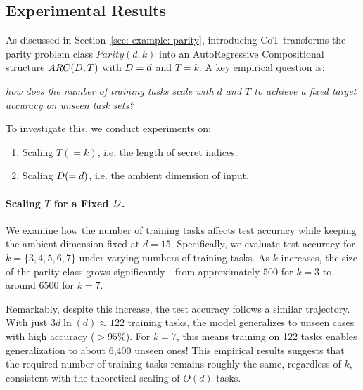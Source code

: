 \vspace{-2mm}
\subsection{Experimental Results}
 As discussed in Section~\ref{sec: example: parity}, introducing CoT transforms the parity problem class \( Parity(d,k) \) into an AutoRegressive Compositional structure \( ARC(D,T) \) with $D = d$ and \( T = k \). A key empirical question is: 

\textit{how does the number of training tasks scale with \( d \) and \( T \) to achieve a fixed target accuracy on unseen task sets? }

To investigate this, we conduct experiments on:
\vspace{-3mm}
\begin{enumerate}
    \item Scaling $T (=k)$, i.e. the length of secret indices. 
    \item Scaling $D (=d)$, i.e. the ambient dimension of input.
\end{enumerate}














\paragraph{Scaling \( T \) for a Fixed \( D \).} 
We examine how the number of training tasks affects test accuracy while keeping the ambient dimension fixed at \( d = 15 \). Specifically, we evaluate test accuracy for \( k = \{3,4,5,6,7\} \) under varying numbers of training tasks. As \( k \) increases, the size of the parity class grows significantly—from approximately $500$ for \( k = 3 \) to around $6500$ for \( k = 7 \). 

Remarkably, despite this increase, the test accuracy follows a similar trajectory. With just \( 3d \ln(d) \approx 122 \) training tasks, the model generalizes to unseen cases with high accuracy (\( >95\% \)). For \( k = 7 \), this means training on 122 tasks enables generalization to about 6,400 unseen ones! This empirical results suggests that the required number of training tasks remains roughly the same, regardless of \( k \), consistent with the theoretical scaling of \( \tilde{O}(d) \) tasks.

